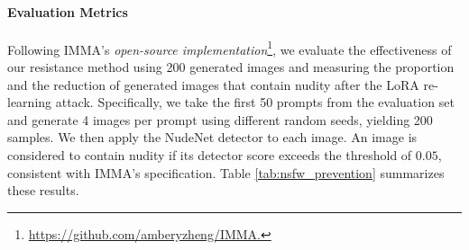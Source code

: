 \documentclass{article}
\theoremstyle{plain}
\theoremstyle{definition}
\theoremstyle{remark}
\begin{document}
\paragraph{Evaluation Metrics} Following IMMA's \emph{open-source implementation}\footnote{\url{https://github.com/amberyzheng/IMMA.}}, we evaluate the effectiveness of our resistance method using 200 generated images and measuring the proportion and the reduction of generated images that contain nudity after the LoRA re-learning attack. Specifically, we take the first 50 prompts from the evaluation set and generate 4 images per prompt using different random seeds, yielding 200 samples. We then apply the NudeNet detector to each image. An image is considered to contain nudity if its detector score exceeds the threshold of $0.05$, consistent with IMMA’s specification. Table \ref{tab:nsfw_prevention} summarizes these results.
\end{document}
